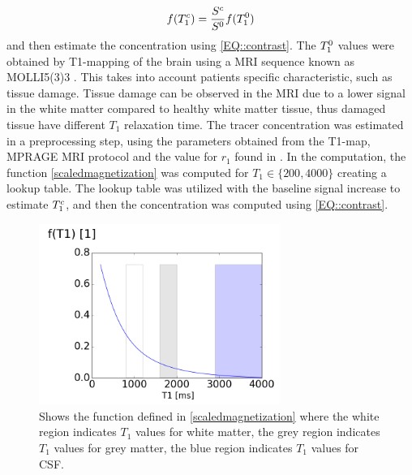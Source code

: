 \documentclass[11pt,a4paper]{article}
\begin{document}
\begin{equation}
f ( T_{1}\sp{c} ) = \frac{S\sp{c}}{S\sp{0}} f(T_{1}\sp{0}) 
\end{equation}
and then estimate the concentration using \eqref{EQ::contrast}. The $T_{1}\sp{0}$ values were obtained by T1-mapping of the brain using a MRI sequence known as MOLLI5(3)3 \cite{TAYLOR201667}. This takes into account patients specific characteristic, such as tissue damage. Tissue damage can be observed in the MRI due to a lower signal in the white matter compared to healthy white matter tissue, thus damaged tissue have different $T_1$ relaxation time. 
The tracer concentration was estimated in a preprocessing step, using the parameters obtained from the T1-map, MPRAGE MRI protocol \cite{eidevalnes} and the value for $r_1$ found in \cite{pmid16230904}. In the computation, the function \eqref{scaledmagnetization} was computed for $ T_1\in \lbrace 200, 4000 \rbrace$ creating a lookup table. The lookup table was utilized with the baseline signal increase to estimate $T_1\sp{c}$, and then the concentration was computed using \eqref{EQ::contrast}.  

\begin{figure}
\centering
\includegraphics[width=0.70\textwidth]{T1function.png} 
\caption{Shows the  function defined in \eqref{scaledmagnetization} where the white region indicates $T_1$ values for white matter, the grey region indicates $T_1$ values for grey matter, the blue region indicates $T_1$ values for CSF.  }
\label{figureF} 
\end{figure}
\end{document}
